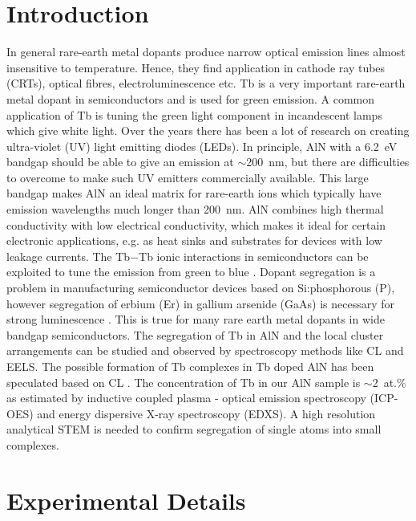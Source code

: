 \documentclass[%
aip,
rsi,%
 amsmath,amssymb,%
 reprint,%
]{revtex4-1}
\begin{document}
\section{Introduction}
\label{sec:Intro}

In general rare-earth metal dopants\cite{Kenyon2003,Kenyon2002} produce narrow optical emission lines almost insensitive to temperature. Hence, they find application in cathode ray tubes (CRTs), optical fibres, electroluminescence etc\cite{Aitasalo2003}. Tb is a very important rare-earth metal dopant in semiconductors and is used for green emission. A common application of Tb is tuning the green light component in incandescent lamps which give white light. Over the years there has been a lot of research on creating ultra-violet (UV) light emitting diodes (LEDs). In principle, AlN with a 6.2~eV bandgap should be able to give an emission at $\sim$200~nm, but there are difficulties to overcome to make such UV emitters commercially available. This large bandgap makes AlN an ideal matrix for rare-earth ions which typically have emission wavelengths much longer than 200~nm. AlN combines high thermal conductivity with low electrical conductivity, which makes it ideal for certain electronic applications, e.g. as heat sinks and substrates for devices with low leakage currents. The Tb$-$Tb ionic interactions in semiconductors can be exploited to tune the emission from green to blue \cite{Benz2013}. Dopant segregation is a problem in manufacturing semiconductor devices based on Si:phosphorous (P)\cite{Keizer2015}, however segregation of erbium (Er) in gallium arsenide (GaAs) is necessary for strong luminescence \cite{Hogg1996,Takahei1993,Takahei1994}. This is true for many rare earth metal dopants in wide bandgap semiconductors. The segregation of Tb in AlN and the local cluster arrangements can be studied and observed by spectroscopy methods like CL and EELS. The possible formation of Tb complexes in Tb doped AlN has been speculated based on CL \cite{Benz2013_AlNTb}. The concentration of Tb in our AlN sample is $\sim$2~at.\% as estimated by inductive coupled plasma - optical emission spectroscopy (ICP-OES) and energy dispersive X-ray spectroscopy (EDXS). A high resolution analytical STEM is needed to confirm segregation of single atoms into small complexes.

\section{Experimental Details}
\label{sec:exp_detail}
\end{document}
